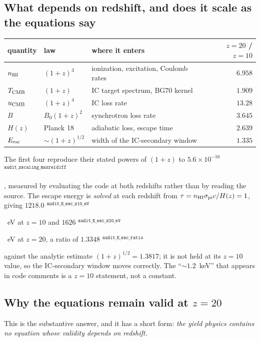 \documentclass[11pt,a4paper]{article}
\newif\ifprovdraft
\newcommand{\src}[1]{%
  \ifprovdraft
    \ifmmode{}^{\text{\color{gray}\scriptsize\texttt{#1}}}%
    \else{\color{gray}\scriptsize$^{\texttt{#1}}$}%
    \fi
  \fi}
\begin{document}
\subsection{What depends on redshift, and does it scale as the equations say}
\begin{center}\small
\begin{tabular}{lllr}
\hline
quantity & law & where it enters & $z{=}20$ / $z{=}10$ \\
\hline
$n_{\rm HI}$      & $(1+z)^3$        & ionization, excitation, Coulomb rates & $6.958$ \\
$T_{\rm CMB}$     & $(1+z)$          & IC target spectrum, BG70 kernel       & $1.909$ \\
$u_{\rm CMB}$     & $(1+z)^4$        & IC loss rate                          & $13.28$ \\
$B$               & $B_0(1+z)^2$     & synchrotron loss rate                 & $3.645$ \\
$H(z)$            & Planck 18        & adiabatic loss, escape time           & $2.639$ \\
$E_{\rm esc}$     & $\sim(1+z)^{1/2}$& width of the IC-secondary window      & $1.335$ \\
\hline
\end{tabular}
\end{center}
The first four reproduce their stated powers of $(1+z)$ to
$5.6\times10^{-16}$\src{audit\_zscaling\_maxreldiff}, measured by evaluating the
code at both redshifts rather than by reading the source. The escape energy is
\emph{solved} at each redshift from $\tau = n_{\rm HI}\sigma_{\rm pi}c/H(z) = 1$,
giving $1218.0$\src{audit\_E\_esc\_z10\_eV}~eV at $z=10$ and
$1626$\src{audit\_E\_esc\_z20\_eV}~eV at $z=20$, a ratio of
$1.3348$\src{audit\_E\_esc\_ratio} against the analytic estimate $(1+z)^{1/2} =
1.3817$; it is not held at its $z=10$ value, so the IC-secondary window moves
correctly. The ``$\sim\!1.2$~keV'' that appears in code comments is a $z=10$
statement, not a constant.

\subsection{Why the equations remain valid at \texorpdfstring{$z=20$}{z=20}}
\label{sec:validity}
This is the substantive answer, and it has a short form: \emph{the yield physics
contains no equation whose validity depends on redshift.}
\end{document}
